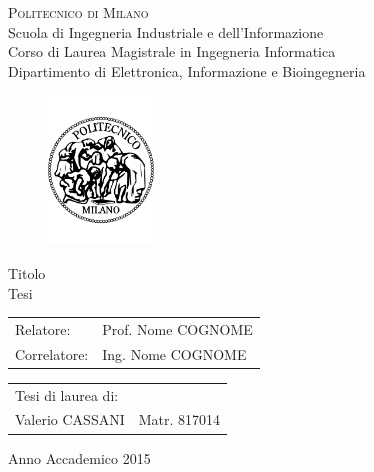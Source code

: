 \begin{titlepage}

\begin{center}
\Large{\textsc{Politecnico di Milano}}\\
\Large{Scuola di Ingegneria Industriale e dell'Informazione}\\
\large{Corso di Laurea Magistrale in Ingegneria Informatica}\\
\large{Dipartimento di Elettronica, Informazione e Bioingegneria}
\par\end{center}

\vspace{0.5cm}


\begin{center}
\begin{figure}[h]
\centering{}\includegraphics[width=0.25\textwidth]{frontespizio/logo-polimi.pdf}
\end{figure}
\vspace{1cm}

\par\end{center}

\begin{center}
\LARGE{Titolo\\
Tesi}\vspace{2cm}

\par\end{center}

\begin{flushleft}
\begin{tabular}{ll}
Relatore:  & Prof. Nome COGNOME\tabularnewline
Correlatore:  & Ing. Nome COGNOME\tabularnewline
\end{tabular}\vspace{1cm}

\par\end{flushleft}

\begin{flushright}
\begin{tabular}{ll}
Tesi di laurea di: & \tabularnewline
Valerio CASSANI & Matr. 817014\tabularnewline
\end{tabular}\vspace{4cm}

\par\end{flushright}

\begin{center}
{\large{}Anno Accademico 2015}
\par\end{center}{\large \par}

\end{titlepage}
